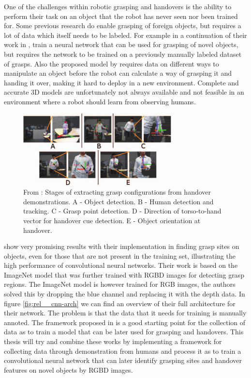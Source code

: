One of the challenges within robotic grasping and handovers is the ability to perform their task on an object that the robot has never seen nor been trained for. Some previous research do enable grasping of foreign objects, but requires a lot of data which itself needs to be labeled. For example \textcite{Huebner2008a} in a continuation of their work in \parencite{Huebner2008}, train a neural network that can be used for grasping of novel objects, but requires the network to be trained on a previously manually labeled dataset of grasps. Also the proposed model by \parencite{Chan2014} requires data on different ways to manipulate an object before the robot can calculate a way of grasping it and handing it over, making it hard to deploy in a new environment. Complete and accurate 3D models are unfortunately not always available and not feasible in an environment where a robot should learn from observing humans.

\begin{figure}
	\centering
	\includegraphics[width=\textwidth]{img/related-work/demonstrations.png}
	\caption{From \parencite{Chan2015a}: Stages of extracting grasp configurations from handover demonstrations. A - Object detection. B - Human detection and tracking. C - Grasp point detection. D - Direction of torso-to-hand vector for handover cue detection. E - Object orientation at handover.}
\end{figure}

\textcite{Redmon2014} show very promising results with their implementation in finding grasp sites on objects, even for those that are not present in the training set, illustrating the high performance of convolutional neural networks. Their work is based on the ImageNet model that was further trained with RGBD images for detecting grasp regions. The ImageNet model is however trained for RGB images, the authors solved this by dropping the blue channel and replacing it with the depth data. In figure \ref{fig:rel__cnn-arch} we can find an overview of their full architecture for their network. The problem is that the data that it needs for training is manually annoted. The framework proposed in \parencite{Chan2015a} is a good starting point for the collection of data as to train a model that can be later used for grasping and handovers. This thesis will try and combine these works by implementing a framework for collecting data through demonstration from humans and process it as to train a convolutional neural network that can later identify grasping sites and handover features on novel objects by RGBD images.

